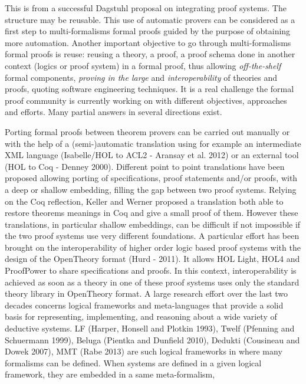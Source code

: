 \begin{oldpart}{This is from a successful Dagstuhl proposal on integrating proof systems. The structure may be reusable.}
This use of automatic provers can be considered as a first step to 
multi-formalisms formal proofs guided by the purpose of obtaining more
automation. Another important objective to go through multi-formalisms
formal proofs is reuse: reusing a theory, a proof, a proof schema done
in another context (logics or proof system) in a formal proof, thus allowing
\emph{off-the-shelf} formal components, \emph{proving in the large} and 
\emph{interoperability} of theories and proofs, quoting software 
engineering techniques. It is a real challenge the formal proof
community is currently working on with different
objectives, approaches and efforts. Many partial answers in several
directions exist. 

Porting formal proofs between theorem provers can be
carried out manually or with the help of a (semi-)automatic
translation using for example an 
intermediate XML language  (Isabelle/HOL to ACL2 -
Aransay et al. 2012)  or an external tool (HOL to Coq - Denney 2000). 
Different point to point translations have been proposed allowing
 porting of specifications, proof statements and/or proofs, with a
 deep or shallow embedding, filling the gap between two proof
 systems. Relying on the Coq reflection,  Keller and Werner proposed a
 translation both able to restore theorems meanings in Coq and give a
 small proof of them. However these translations, in particular shallow embeddings,  can be difficult if not impossible if the two proof
 systems use very different foundations.
A particular effort has been brought on the interoperability of
 higher order logic based proof systems with  the design of the OpenTheory format (Hurd - 2011). It allows HOL Light, HOL4 and
 ProofPower to share specifications and proofs. In this context,  
interoperability is achieved as soon as a theory in one of these proof
 systems uses only the standard theory library in OpenTheory
 format. A large research effort over the last two decades concerns
 logical frameworks and meta-languages that provide a solid basis
for representing, implementing, and reasoning about a wide variety of
deductive systems. LF (Harper, Honsell and Plotkin 1993), Twelf
 (Pfenning and Schuermann 1999), Beluga (Pientka and Dunfield 2010),
 Dedukti (Cousineau and Dowek 2007), MMT (Rabe 2013) are such logical frameworks in where many formalisms can be defined.  When systems are defined in a given logical framework, they are embedded in a same meta-formalism,

\end{oldpart}
